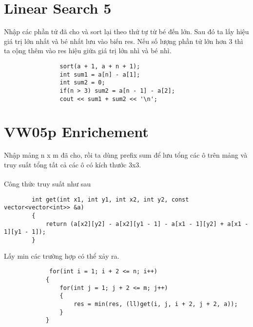 \documentclass{article}
\begin{document}
\section*{Linear Search 5}
Nhập các phần tử đã cho và sort lại theo thứ tự từ bé đến lớn. Sau đó ta lấy hiệu giá trị lớn nhất và bé nhất lưu vào biến res. Nếu số lượng phần tử lớn hơn 3 thì ta cộng thêm vào res hiệu giữa giá trị lớn nhì và bé nhì.

 \begin{verbatim}
                sort(a + 1, a + n + 1);
                int sum1 = a[n] - a[1];
                int sum2 = 0;
                if(n > 3) sum2 = a[n - 1] - a[2];
                cout << sum1 + sum2 << '\n';
\end{verbatim}

\section*{VW05p Enrichement}
Nhập mảng n x m đã cho, rồi ta dùng prefix sum để lưu tổng các ô trên mảng và truy suất tổng tất cả các ô có kích thước 3x3.\\ \\
Công thức truy suất như sau

 \begin{verbatim}
        int get(int x1, int y1, int x2, int y2, const vector<vector<int>> &a)
        {   
            return (a[x2][y2] - a[x2][y1 - 1] - a[x1 - 1][y2] + a[x1 - 1][y1 - 1]);
        }

\end{verbatim}

Lấy min các trường hợp có thể xảy ra.
 
\begin{verbatim}
             for(int i = 1; i + 2 <= n; i++)
            {
                for(int j = 1; j + 2 <= m; j++)
                {
                    res = min(res, (ll)get(i, j, i + 2, j + 2, a));
                }
            }
\end{verbatim}
\end{document}
